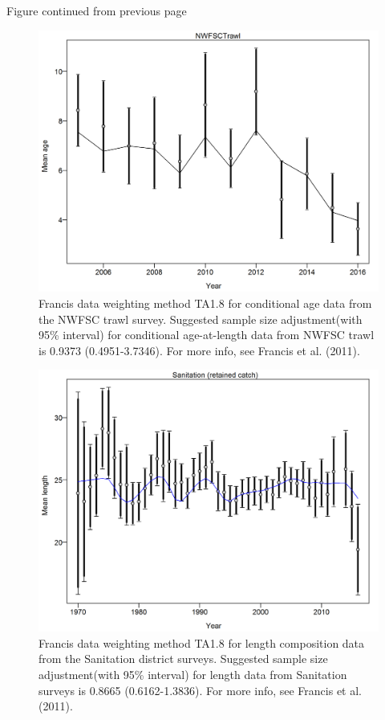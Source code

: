 \documentclass[12pt,]{article}
\begin{document}
\begin{center} 

              Figure continued from previous page 

             \end{center}

\begin{figure}[htbp]
\centering
\includegraphics{r4ss/plots_mod1/comp_condAALdat_data_weighting_TA1.8_condAgeNWFSCTrawl.png}
\caption{Francis data weighting method TA1.8 for conditional age data
from the NWFSC trawl survey. Suggested sample size adjustment(with 95\%
interval) for conditional age-at-length data from NWFSC trawl is 0.9373
(0.4951-3.7346). For more info, see Francis et al. (2011).
\label{fig:comp_condAALdat_data_weighting_TA1.8_condAgeNWFSCTrawl}}
\end{figure}

\begin{figure}[htbp]
\centering
\includegraphics{r4ss/plots_mod1/comp_lendat_data_weighting_TA1.8_Sanitation.png}
\caption{Francis data weighting method TA1.8 for length composition data
from the Sanitation district surveys. Suggested sample size
adjustment(with 95\% interval) for length data from Sanitation surveys
is 0.8665 (0.6162-1.3836). For more info, see Francis et al. (2011).
\label{fig:comp_lendat_data_weighting_TA1.8_Sanitation}}
\end{figure}
\end{document}
